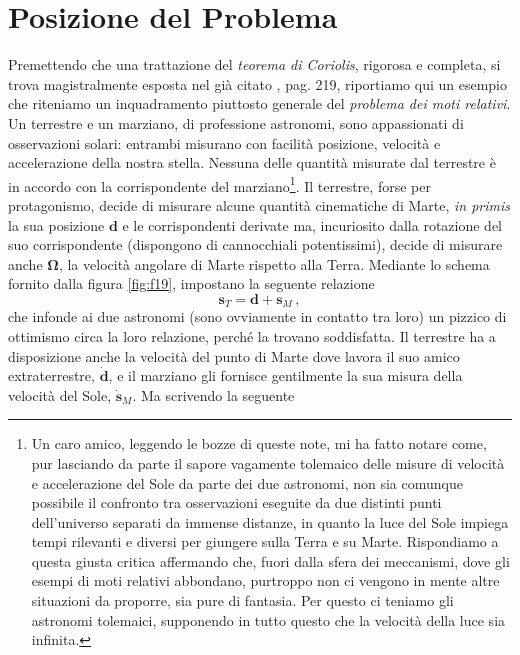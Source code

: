 \section{Posizione del Problema}
Premettendo che una trattazione del {\em teorema di Coriolis}, rigorosa e completa, si trova
magistralmente esposta nel gi\`a citato \cite{finzi}, pag. 219, riportiamo qui un esempio che 
riteniamo un inquadramento piuttosto generale del {\em problema dei moti relativi}.
Un terrestre e un marziano,
di professione astronomi, sono appassionati di osservazioni solari:
entrambi misurano con facilit\`a posizione, velocit\`a e accelerazione della nostra 
stella. Nessuna delle quantit\`a misurate dal terrestre \`e in accordo con la
corrispondente del marziano\footnote{Un caro amico, leggendo le bozze di queste note,
mi ha fatto notare come, pur lasciando da parte il sapore vagamente tolemaico
delle misure di velocit\`a e accelerazione del Sole da parte dei due astronomi,
 non sia comunque possibile il confronto tra  osservazioni
eseguite da due distinti punti dell'universo separati da immense distanze, in quanto
la luce del Sole impiega tempi rilevanti e diversi per giungere sulla Terra e su Marte.
Rispondiamo a questa giusta critica affermando che,
 fuori dalla sfera dei meccanismi, dove gli esempi di moti relativi abbondano,
purtroppo non ci vengono in mente
altre situazioni da proporre, sia pure di fantasia.
Per questo ci teniamo gli astronomi tolemaici,
 supponendo in tutto questo che la velocit\`a della luce sia infinita.}.
 Il terrestre, forse per protagonismo, decide di misurare
alcune quantit\`a cinematiche di Marte, {\em in primis} la sua posizione $\bm d$ e le 
corrispondenti
derivate ma,
incuriosito dalla rotazione del suo corrispondente (dispongono di cannocchiali potentissimi), decide di misurare anche
$\bm \Omega$, la velocit\`a angolare di Marte rispetto alla Terra.
Mediante lo schema fornito dalla figura
\ref{fig:f19}, impostano la seguente relazione
\begin{equation}
	\bm{s}_{\scriptscriptstyle{T}}=
	\bm{d}+
	\bm{s}_{\scriptscriptstyle{M}}\,,
\label{e128}
\end{equation}
\noindent che infonde ai due astronomi (sono ovviamente in contatto tra loro)
un pizzico di ottimismo circa la loro relazione, perch\'e la trovano soddisfatta.
Il terrestre ha a disposizione anche la velocit\`a del punto di Marte dove lavora il suo
amico extraterrestre,
$\dot{\bm d}$, e il marziano gli fornisce gentilmente la sua misura della
velocit\`a del Sole,
$\dot{\bm{s}}_{\scriptscriptstyle{M}}$.
Ma scrivendo la seguente
